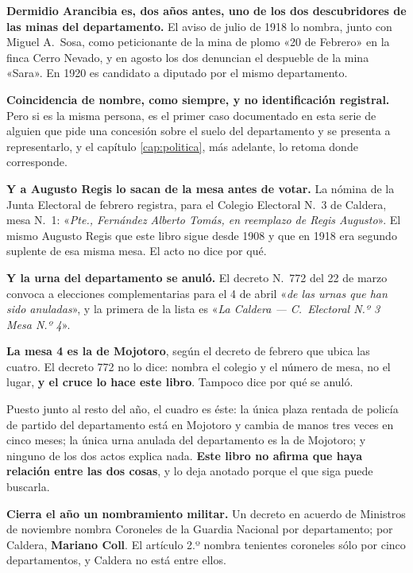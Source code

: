 \begin{cautela}
\textbf{Dermidio Arancibia es, dos años antes, uno de los dos descubridores de las minas del
departamento.} El aviso de julio de 1918 lo nombra, junto con Miguel A.\ Sosa, como peticionante
de la mina de plomo «20 de Febrero» en la finca Cerro Nevado, y en agosto los dos denuncian el
despueble de la mina «Sara». En 1920 es candidato a diputado por el mismo departamento.

\textbf{Coincidencia de nombre, como siempre, y no identificación registral.} Pero si es la misma
persona, es el primer caso documentado en esta serie de alguien que pide una concesión sobre el
suelo del departamento y se presenta a representarlo, y el capítulo \ref{cap:politica}, más adelante, lo retoma
donde corresponde.
\end{cautela}

\textbf{Y a Augusto Regis lo sacan de la mesa antes de votar.} La nómina de la Junta Electoral de
febrero registra, para el Colegio Electoral N.\ 3 de Caldera, mesa N.\ 1: «\textit{Pte.,
Fernández Alberto Tomás, en reemplazo de Regis Augusto}». El mismo Augusto
Regis que este libro sigue desde 1908 y que en 1918 era segundo suplente de esa misma mesa. El
acto no dice por qué.

\textbf{Y la urna del departamento se anuló.} El decreto N.\ 772 del 22 de marzo convoca a
elecciones complementarias para el 4 de abril «\textit{de las urnas que han sido anuladas}», y la
primera de la lista es «\textit{La Caldera --- C.\ Electoral N.º 3 Mesa N.º 4}».

\begin{cautela}
\textbf{La mesa 4 es la de Mojotoro}, según el decreto de febrero que ubica las cuatro. El decreto
772 no lo dice: nombra el colegio y el número de mesa, no el lugar, \textbf{y el cruce lo hace
este libro}. Tampoco dice por qué se anuló.

Puesto junto al resto del año, el cuadro es éste: la única plaza rentada de policía de partido del
departamento está en Mojotoro y cambia de manos tres veces en cinco meses; la única urna anulada
del departamento es la de Mojotoro; y ninguno de los dos actos explica nada. \textbf{Este libro no
afirma que haya relación entre las dos cosas}, y lo deja anotado porque el que siga puede
buscarla.
\end{cautela}

\textbf{Cierra el año un nombramiento militar.} Un decreto en acuerdo de Ministros de noviembre
nombra Coroneles de la Guardia Nacional por departamento; por Caldera, \textbf{Mariano Coll}. El
artículo 2.º nombra tenientes coroneles sólo por cinco departamentos, y Caldera no está entre
ellos.

